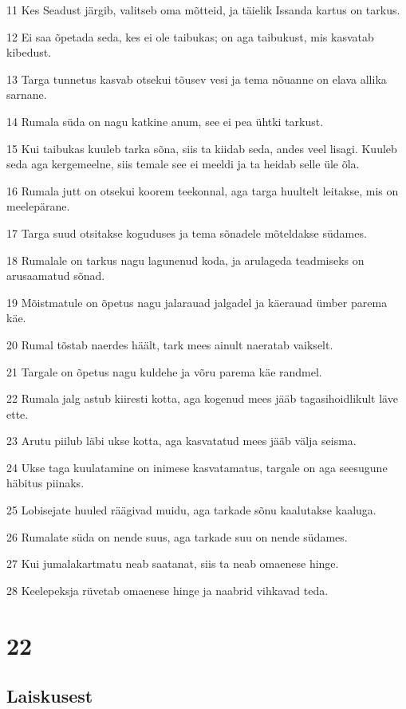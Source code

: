 \par 11 Kes Seadust järgib, valitseb oma mõtteid, ja täielik Issanda kartus on tarkus.
\par 12 Ei saa õpetada seda, kes ei ole taibukas; on aga taibukust, mis kasvatab kibedust.
\par 13 Targa tunnetus kasvab otsekui tõusev vesi ja tema nõuanne on elava allika sarnane.
\par 14 Rumala süda on nagu katkine anum, see ei pea ühtki tarkust.
\par 15 Kui taibukas kuuleb tarka sõna, siis ta kiidab seda, andes veel lisagi. Kuuleb seda aga kergemeelne, siis temale see ei meeldi ja ta heidab selle üle õla.
\par 16 Rumala jutt on otsekui koorem teekonnal, aga targa huultelt leitakse, mis on meelepärane.
\par 17 Targa suud otsitakse koguduses ja tema sõnadele mõteldakse südames.
\par 18 Rumalale on tarkus nagu lagunenud koda, ja arulageda teadmiseks on arusaamatud sõnad.
\par 19 Mõistmatule on õpetus nagu jalarauad jalgadel ja käerauad ümber parema käe.
\par 20 Rumal tõstab naerdes häält, tark mees ainult naeratab vaikselt.
\par 21 Targale on õpetus nagu kuldehe ja võru parema käe randmel.
\par 22 Rumala jalg astub kiiresti kotta, aga kogenud mees jääb tagasihoidlikult läve ette.
\par 23 Arutu piilub läbi ukse kotta, aga kasvatatud mees jääb välja seisma.
\par 24 Ukse taga kuulatamine on inimese kasvatamatus, targale on aga seesugune häbitus piinaks.
\par 25 Lobisejate huuled räägivad muidu, aga tarkade sõnu kaalutakse kaaluga.
\par 26 Rumalate süda on nende suus, aga tarkade suu on nende südames.
\par 27 Kui jumalakartmatu neab saatanat, siis ta neab omaenese hinge.
\par 28 Keelepeksja rüvetab omaenese hinge ja naabrid vihkavad teda.

\chapter{22}

\section*{Laiskusest}


